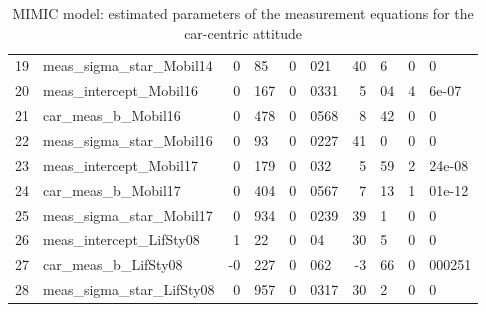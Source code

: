 \documentclass[12pt,a4paper]{article}
\begin{document}
\begin{table}[htb]
\begin{center}
\begin{tabular}{rlr@{.}lr@{.}lr@{.}lr@{.}l}
19 & meas\_sigma\_star\_Mobil14 & 0&85 & 0&021 & 40&6 & 0&0 \\ 
20 & meas\_intercept\_Mobil16 & 0&167 & 0&0331 & 5&04 & 4&6e-07 \\ 
21 & car\_meas\_b\_Mobil16 & 0&478 & 0&0568 & 8&42 & 0&0 \\ 
22 & meas\_sigma\_star\_Mobil16 & 0&93 & 0&0227 & 41&0 & 0&0 \\ 
23 & meas\_intercept\_Mobil17 & 0&179 & 0&032 & 5&59 & 2&24e-08 \\ 
24 & car\_meas\_b\_Mobil17 & 0&404 & 0&0567 & 7&13 & 1&01e-12 \\ 
25 & meas\_sigma\_star\_Mobil17 & 0&934 & 0&0239 & 39&1 & 0&0 \\ 
26 & meas\_intercept\_LifSty08 & 1&22 & 0&04 & 30&5 & 0&0 \\ 
27 & car\_meas\_b\_LifSty08 & -0&227 & 0&062 & -3&66 & 0&000251 \\ 
28 & meas\_sigma\_star\_LifSty08 & 0&957 & 0&0317 & 30&2 & 0&0 \\ 
\end{tabular}
  \caption{MIMIC model: estimated parameters of the measurement equations for the car-centric attitude\label{tab:mimic_params_car_meas}}
  \end{center}
\end{table}
\end{document}
